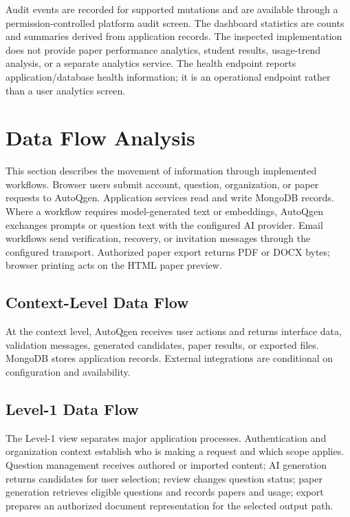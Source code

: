 Audit events are recorded for supported mutations and are available through a permission-controlled platform audit screen. The dashboard statistics are counts and summaries derived from application records. The inspected implementation does not provide paper performance analytics, student results, usage-trend analysis, or a separate analytics service. The health endpoint reports application/database health information; it is an operational endpoint rather than a user analytics screen.

\section{Data Flow Analysis}

This section describes the movement of information through implemented workflows. Browser users submit account, question, organization, or paper requests to AutoQgen. Application services read and write MongoDB records. Where a workflow requires model-generated text or embeddings, AutoQgen exchanges prompts or question text with the configured AI provider. Email workflows send verification, recovery, or invitation messages through the configured transport. Authorized paper export returns PDF or DOCX bytes; browser printing acts on the HTML paper preview.

\subsection{Context-Level Data Flow}

At the context level, AutoQgen receives user actions and returns interface data, validation messages, generated candidates, paper results, or exported files. MongoDB stores application records. External integrations are conditional on configuration and availability.



\subsection{Level-1 Data Flow}

The Level-1 view separates major application processes. Authentication and organization context establish who is making a request and which scope applies. Question management receives authored or imported content; AI generation returns candidates for user selection; review changes question status; paper generation retrieves eligible questions and records papers and usage; export prepares an authorized document representation for the selected output path.




